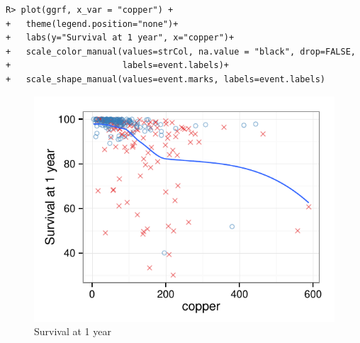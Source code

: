 \documentclass[nojss]{jss}
\begin{document}
\begin{knitrout}\footnotesize
{}\color{fgcolor}\begin{kframe}
\begin{verbatim}
R> plot(ggrf, x_var = "copper") +
+   theme(legend.position="none")+
+   labs(y="Survival at 1 year", x="copper")+
+   scale_color_manual(values=strCol, na.value = "black", drop=FALSE,
+                      labels=event.labels)+
+   scale_shape_manual(values=event.marks, labels=event.labels)
\end{verbatim}
\end{kframe}\begin{figure}[!htpb]

{\centering \includegraphics[width=\maxwidth]{figure/rfs-variable-plotCopper-1} 

}

\caption[Survival at 1 year]{Survival at 1 year\label{fig:variable-plotCopper}}
\end{figure}


\end{knitrout}
\end{document}

